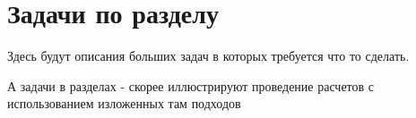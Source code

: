 \section{Задачи по разделу}

Здесь будут описания больших задач в которых требуется что то сделать.

А задачи в разделах - скорее иллюстрируют проведение расчетов с использованием изложенных там подходов